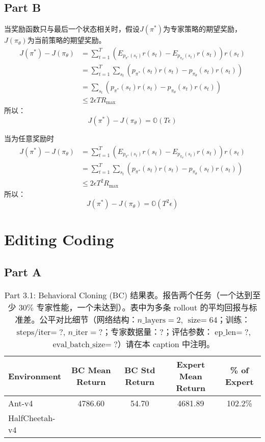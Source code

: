 \documentclass[12pt,oneside]{book}
\begin{document}
\subsection{Part B}
当奖励函数只与最后一个状态相关时，假设$J(\pi^*)$为专家策略的期望奖励，$J(\pi_{\theta})$为当前策略的期望奖励。
\begin{align}
    {J}(\pi^*) - {J}(\pi_{\theta}) 
    &= \sum_{t=1}^{T} (E_{p_{\pi^*}(s_t)}r(s_t) - E_{p_{\pi_{\theta}}(s_t)}r(s_t)) r(s_t)\nonumber \\
    &= \sum_{t=1}^{T} \sum_{s_t} (p_{\pi^*}(s_t)r(s_t) - p_{\pi_{\theta}}(s_t)r(s_t)) \nonumber \\
    &= \sum_{s_t} (p_{\pi^*}(s_t)r(s_t) - p_{\pi_{\theta}}(s_t)r(s_t)) \nonumber \\
    &\leq 2\epsilon T R_{\max}
\end{align}
所以：
\begin{equation}
    {J}(\pi^*) - {J}(\pi_{\theta}) = \mathbb{O}(T \epsilon)
\end{equation}

当为任意奖励时
\begin{align}
    {J}(\pi^*) - {J}(\pi_{\theta}) 
    &= \sum_{t=1}^{T} (E_{p_{\pi^*}(s_t)}r(s_t) - E_{p_{\pi_{\theta}}(s_t)}r(s_t)) r(s_t)\nonumber \\
    &= \sum_{t=1}^{T} \sum_{s_t} (p_{\pi^*}(s_t)r(s_t) - p_{\pi_{\theta}}(s_t)r(s_t)) \nonumber \\
    &\leq 2\epsilon T^2 R_{\max}
\end{align}
所以：
\begin{equation}
    {J}(\pi^*) - {J}(\pi_{\theta}) = \mathbb{O}(T^2 \epsilon)
\end{equation}

\section{Editing Coding}

\subsection{Part A}
\begin{table}[h!]
    \centering
    \caption{Part 3.1: Behavioral Cloning (BC) 结果表。报告两个任务（一个达到至少 \(30\%\) 专家性能，一个未达到）。表中为多条 rollout 的平均回报与标准差。公平对比细节（网络结构：\(n\_\text{layers}=\)2, \(\text{size}=\)64；训练：\(\text{steps/iter}=\)?, \(n\_\text{iter}=\)?；专家数据量：?；评估参数：\(\text{ep\_len}=\)?, \(\text{eval\_batch\_size}=\)?）请在本 caption 中注明。}
    \label{tab:bc_part3_1}
    \vspace{0.5em}
    \begin{tabular}{lcccc}
    \hline
    Environment & BC Mean Return & BC Std Return & Expert Mean Return & \% of Expert \\
    \hline
    Ant-v4 & 4786.60 & 54.70 & 4681.89 & 102.2\% \\
    HalfCheetah-v4 &  &  &  &  \\
    \hline
    \end{tabular}
\end{table}
    
\end{document}
